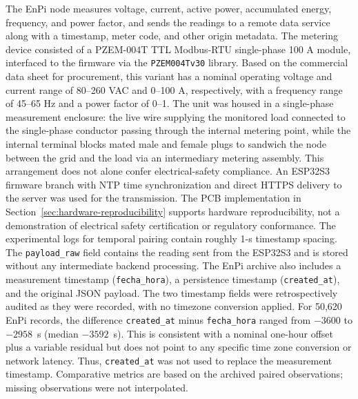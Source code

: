 \documentclass[technologies,article,submit,pdftex,moreauthors]{Definitions/mdpi}
\begin{document}
The EnPi node measures voltage, current, active power, accumulated energy, frequency, and power factor, and sends the readings to a remote data service along with a timestamp, meter code, and other origin metadata. The metering device consisted of a PZEM-004T TTL Modbus-RTU single-phase 100 A module, interfaced to the firmware via the \texttt{PZEM004Tv30} library. Based on the commercial data sheet for procurement, this variant has a nominal operating voltage and current range of 80--260 VAC and 0--100 A, respectively, with a frequency range of 45--65 Hz and a power factor of 0--1. The unit was housed in a single-phase measurement enclosure: the live wire supplying the monitored load connected to the single-phase conductor passing through the internal metering point, while the internal terminal blocks mated male and female plugs to sandwich the node between the grid and the load via an intermediary metering assembly. This arrangement does not alone confer electrical-safety compliance. 
An ESP32S3 firmware branch with NTP time synchronization and direct HTTPS delivery to the server was used for the transmission. The PCB implementation in Section~\ref{sec:hardware-reproducibility} supports hardware reproducibility, not a demonstration of electrical safety certification or regulatory conformance. The experimental logs for temporal pairing contain roughly 1-s timestamp spacing. The \texttt{payload\_raw} field contains the reading sent from the ESP32S3 and is stored without any intermediate backend processing. The EnPi archive also includes a measurement timestamp (\texttt{fecha\_hora}), a persistence timestamp (\texttt{created\_at}), and the original JSON payload. The two timestamp fields were retrospectively audited as they were recorded, with no timezone conversion applied. For 50,620 EnPi records, the difference \texttt{created\_at} minus \texttt{fecha\_hora} ranged from $-3600$ to $-2958$~s (median $-3592$~s). This is consistent with a nominal one-hour offset plus a variable residual but does not point to any specific time zone conversion or network latency. Thus, \texttt{created\_at} was not used to replace the measurement timestamp. Comparative metrics are based on the archived paired observations; missing observations were not interpolated.
\end{document}
